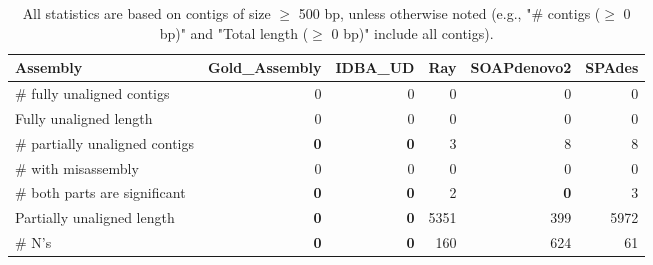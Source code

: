 \documentclass[12pt,a4paper]{article}
\begin{document}
\begin{table}[ht]
\begin{center}
\caption{All statistics are based on contigs of size $\geq$ 500 bp, unless otherwise noted (e.g., "\# contigs ($\geq$ 0 bp)" and "Total length ($\geq$ 0 bp)" include all contigs).}
\begin{tabular}{|l*{5}{|r}|}
\hline
Assembly & Gold\_Assembly & IDBA\_UD & Ray & SOAPdenovo2 & SPAdes \\ \hline
\# fully unaligned contigs & 0 & 0 & 0 & 0 & 0 \\ \hline
Fully unaligned length & 0 & 0 & 0 & 0 & 0 \\ \hline
\# partially unaligned contigs & {\bf 0} & {\bf 0} & 3 & 8 & 8 \\ \hline
\hspace{5mm}\# with misassembly & 0 & 0 & 0 & 0 & 0 \\ \hline
\hspace{5mm}\# both parts are significant & {\bf 0} & {\bf 0} & 2 & {\bf 0} & 3 \\ \hline
Partially unaligned length & {\bf 0} & {\bf 0} & 5351 & 399 & 5972 \\ \hline
\# N's & {\bf 0} & {\bf 0} & 160 & 624 & 61 \\ \hline
\end{tabular}
\end{center}
\end{table}
\end{document}

